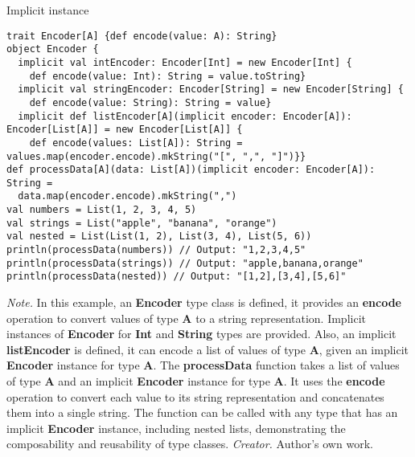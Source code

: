 \begin{table}[h!]
\caption{Implicit instance}
\begin{lstlisting}
trait Encoder[A] {def encode(value: A): String}
object Encoder {
  implicit val intEncoder: Encoder[Int] = new Encoder[Int] {
    def encode(value: Int): String = value.toString}
  implicit val stringEncoder: Encoder[String] = new Encoder[String] {
    def encode(value: String): String = value}
  implicit def listEncoder[A](implicit encoder: Encoder[A]): Encoder[List[A]] = new Encoder[List[A]] {
    def encode(values: List[A]): String = values.map(encoder.encode).mkString("[", ",", "]")}}
def processData[A](data: List[A])(implicit encoder: Encoder[A]): String =
  data.map(encoder.encode).mkString(",") 
val numbers = List(1, 2, 3, 4, 5)
val strings = List("apple", "banana", "orange")
val nested = List(List(1, 2), List(3, 4), List(5, 6))
println(processData(numbers)) // Output: "1,2,3,4,5"
println(processData(strings)) // Output: "apple,banana,orange"
println(processData(nested)) // Output: "[1,2],[3,4],[5,6]"
\end{lstlisting}
\small
\textit{Note.} In this example, an \textbf{Encoder} type class is defined, it provides an \textbf{encode} operation to convert values of type \textbf{A} to a string representation. Implicit instances of \textbf{Encoder} for \textbf{Int} and \textbf{String} types are provided. Also, an implicit \textbf{listEncoder} is defined, it can encode a list of values of type \textbf{A}, given an implicit \textbf{Encoder} instance for type \textbf{A}.
The \textbf{processData} function takes a list of values of type \textbf{A} and an implicit \textbf{Encoder} instance for type \textbf{A}. It uses the \textbf{encode} operation to convert each value to its string representation and concatenates them into a single string. The function can be called with any type that has an implicit \textbf{Encoder} instance, including nested lists, demonstrating the composability and reusability of type classes.
\textit{Creator.} Author's own work.
\end{table}